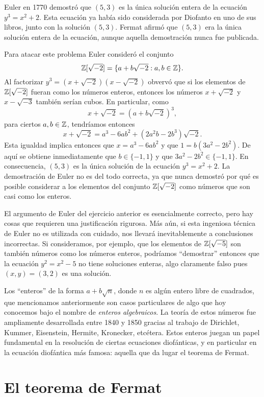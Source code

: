 \begin{example}
	Euler en 1770 demostró que $(5,3)$ es la única solución entera de la
	ecuación $y^3=x^2+2$. Esta ecuación ya había sido considerada por Diofanto
	en uno de sus libros, junto con la solución $(5,3)$. Fermat afirmó que
	$(5,3)$ era la única solución entera de la ecuación, aunque aquella
	demostración nunca fue publicada. 

	Para atacar este problema Euler consideró el conjunto
	\[
		\mathbb{Z}[\sqrt{-2}]=\{a+b\sqrt{-2}:a,b\in\mathbb{Z}\}.
	\]
	Al factorizar $y^3=(x+\sqrt{-2})(x-\sqrt{-2})$ obvervó que si los elementos
	de $\mathbb{Z}[\sqrt{-2}]$ fueran como los números enteros, entonces los números
	$x+\sqrt{-2}$ y $x-\sqrt{-3}$ también serían cubos. En particular, como
	\[
		x+\sqrt{-2}=(a+b\sqrt{-2})^3,
	\]
	para ciertos $a,b\in\mathbb{Z}$, tendríamos entonces
	\[
		x+\sqrt{-2}=a^3-6ab^2+(2a^2b-2b^3)\sqrt{-2}.
	\]
	Esta igualdad implica entonces que $x=a^3-6ab^2$ y que $1=b(3a^2-2b^2)$. 
	De aquí se obtiene inmediatamente que $b\in\{-1,1\}$ y que $3a^2-2b^2\in\{-1,1\}$. 
	En consecuencia, $(5,3)$ es la única solución de la
	ecuación $y^3=x^2+2$. La demostración de Euler no es del todo correcta, ya
	que nunca demostró por qué es posible considerar a los elementos del
	conjunto $\mathbb{Z}[\sqrt{-2}]$ como números que son casi como los enteros.
\end{example}

El argumento de Euler del ejercicio anterior es esencialmente correcto, pero
hay cosas que requieren una justificación rigurosa.  Más aún, si esta ingeniosa
técnica de Euler no es utilizada con cuidado, nos llevará inevitablemente a
conclusiones incorrectas. Si consideramos, por ejemplo, que los elementos de
$\mathbb{Z}[\sqrt{-5}]$ son también números como los números enteros, podríamos
``demostrar'' entonces que la ecuación $y^2=x^2-5$ no tiene soluciones enteras,
algo claramente falso pues $(x,y)=(3,2)$ es una solución.  

Los ``enteros'' de la forma $a+b\sqrt{n}$, donde $n$ es algún entero libre de
cuadrados, que mencionamos anteriormente son casos particulares de algo que hoy
conocemos bajo el nombre de \emph{enteros algebraicos}. La teoría de estos
números fue ampliamente desarrollada entre 1840 y 1850 gracias al trabajo de
Dirichlet, Kummer, Eisenstein, Hermite, Kronecker, etcétera. Estos enteros juegan un
papel fundamental en la resolución de ciertas ecuaciones diofánticas, y en
particular en la ecuación diofántica más famosa: aquella que da lugar el
teorema de Fermat.

\section*{El teorema de Fermat}

